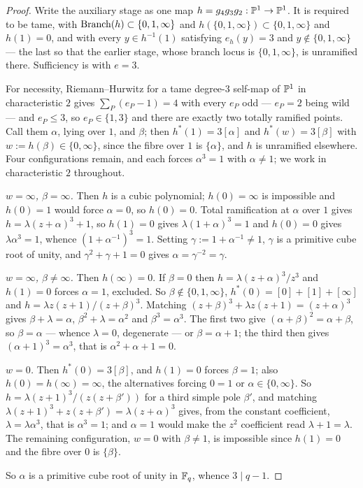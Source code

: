 \begin{proof}
Write the auxiliary stage as one map $h = g_4g_3g_2 : \mathbb{P}^1 \to \mathbb{P}^1$. It
is required to be tame, with $\operatorname{Branch}(h) \subset \{0,1,\infty\}$ and
$h(\{0,1,\infty\}) \subset \{0,1,\infty\}$ and $h(1) = 0$, and with every
$y \in h^{-1}(1)$ satisfying $e_h(y) = 3$ and $y \notin \{0,1,\infty\}$ ---
the last so that the earlier stage, whose branch locus is $\{0,1,\infty\}$,
is unramified there. Sufficiency is  with $e = 3$.

For necessity, Riemann--Hurwitz for a tame degree-$3$ self-map of $\mathbb{P}^1$ in
characteristic $2$ gives $\sum_P(e_P-1) = 4$ with every $e_P$ odd --- $e_P =
2$ being wild --- and $e_P \le 3$, so $e_P \in \{1,3\}$ and there are
exactly two totally ramified points. Call them $\alpha$, lying over $1$, and
$\beta$; then $h^*(1) = 3[\alpha]$ and $h^*(w) = 3[\beta]$ with $w := h(\beta)
\in \{0,\infty\}$, since the fibre over $1$ is $\{\alpha\}$, and $h$ is
unramified elsewhere. Four configurations remain, and each forces $\alpha^3
= 1$ with $\alpha \ne 1$; we work in characteristic $2$ throughout.

\emph{$w = \infty$, $\beta = \infty$.} Then $h$ is a cubic polynomial;
$h(0) = \infty$ is impossible and $h(0) = 1$ would force $\alpha = 0$, so
$h(0) = 0$. Total ramification at $\alpha$ over $1$ gives $h =
\lambda(z+\alpha)^3 + 1$, so $h(1) = 0$ gives $\lambda(1+\alpha)^3 = 1$ and
$h(0) = 0$ gives $\lambda\alpha^3 = 1$, whence $(1+\alpha^{-1})^3 = 1$.
Setting $\gamma := 1 + \alpha^{-1} \ne 1$, $\gamma$ is a primitive cube root
of unity, and $\gamma^2 + \gamma + 1 = 0$ gives $\alpha = \gamma^{-2} =
\gamma$.

\emph{$w = \infty$, $\beta \ne \infty$.} Then $h(\infty) = 0$. If $\beta =
0$ then $h = \lambda(z+\alpha)^3/z^3$ and $h(1) = 0$ forces $\alpha = 1$,
excluded. So $\beta \notin\{0,1,\infty\}$, $h^*(0) = [0]+[1]+[\infty]$ and
$h = \lambda z(z+1)/(z+\beta)^3$. Matching $(z+\beta)^3 + \lambda z(z+1) =
(z+\alpha)^3$ gives $\beta + \lambda = \alpha$, $\beta^2 + \lambda =
\alpha^2$ and $\beta^3 = \alpha^3$. The first two give $(\alpha+\beta)^2 =
\alpha+\beta$, so $\beta = \alpha$ --- whence $\lambda = 0$, degenerate ---
or $\beta = \alpha+1$; the third then gives $(\alpha+1)^3 = \alpha^3$, that
is $\alpha^2+\alpha+1 = 0$.

\emph{$w = 0$.} Then $h^*(0) = 3[\beta]$, and $h(1) = 0$ forces $\beta = 1$;
also $h(0) = h(\infty) = \infty$, the alternatives forcing $0 = 1$ or
$\alpha \in \{0,\infty\}$. So $h = \lambda(z+1)^3/(z(z+\beta'))$ for a third
simple pole $\beta'$, and matching $\lambda(z+1)^3 + z(z+\beta') =
\lambda(z+\alpha)^3$ gives, from the constant coefficient, $\lambda =
\lambda\alpha^3$, that is $\alpha^3 = 1$; and $\alpha = 1$ would make the
$z^2$ coefficient read $\lambda + 1 = \lambda$. The remaining configuration,
$w = 0$ with $\beta \ne 1$, is impossible since $h(1) = 0$ and the fibre
over $0$ is $\{\beta\}$.

So $\alpha$ is a primitive cube root of unity in $\mathbb{F}_q$, whence $3 \mid q-1$.
\end{proof}

